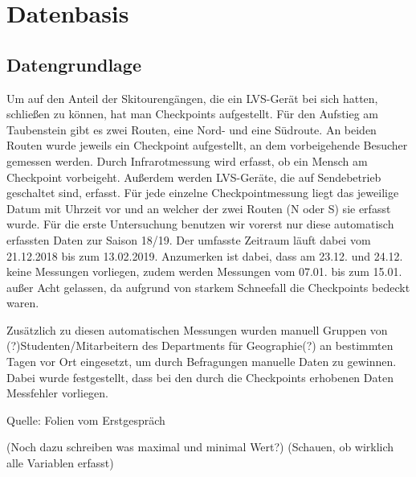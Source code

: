 \documentclass[11pt,a4paper]{report}
\begin{document}
\chapter{Datenbasis}

\section{Datengrundlage}

Um auf den Anteil der Skitourengängen, die ein LVS-Gerät bei sich hatten, schließen zu können, hat man Checkpoints aufgestellt. Für den Aufstieg am Taubenstein gibt es zwei Routen, eine Nord- und eine Südroute. An beiden Routen wurde jeweils ein Checkpoint aufgestellt, an dem vorbeigehende Besucher gemessen werden. Durch Infrarotmessung wird erfasst, ob ein Mensch am Checkpoint vorbeigeht. Außerdem werden LVS-Geräte, die auf Sendebetrieb geschaltet sind, erfasst. Für jede einzelne Checkpointmessung liegt das jeweilige Datum mit Uhrzeit vor und an welcher der zwei Routen (N oder S) sie erfasst wurde.
Für die erste Untersuchung benutzen wir vorerst nur diese automatisch erfassten Daten zur Saison 18/19. Der umfasste Zeitraum läuft dabei vom 21.12.2018 bis zum 13.02.2019. Anzumerken ist dabei, dass am 23.12. und 24.12. keine Messungen vorliegen, zudem werden Messungen vom 07.01. bis zum 15.01. außer Acht gelassen, da aufgrund von starkem Schneefall die Checkpoints bedeckt waren.

Zusätzlich zu diesen automatischen Messungen wurden manuell Gruppen von (?)Studenten/Mitarbeitern des Departments für Geographie(?) an bestimmten Tagen vor Ort eingesetzt, um durch Befragungen manuelle Daten zu gewinnen. Dabei wurde festgestellt, dass bei den durch die Checkpoints erhobenen Daten Messfehler vorliegen.

Quelle:
Folien vom Erstgespräch

(Noch dazu schreiben was maximal und minimal Wert?)
(Schauen, ob wirklich alle Variablen erfasst)
\end{document}
